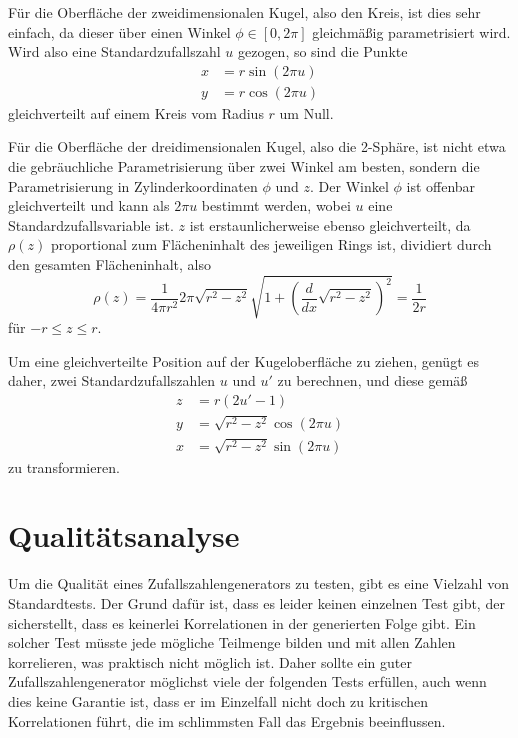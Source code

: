 Für die Oberfläche der zweidimensionalen Kugel, also den Kreis, ist
dies sehr einfach, da dieser über einen Winkel $\phi\in [0,2\pi]$
gleichmäßig parametrisiert wird. Wird also eine Standardzufallszahl
$u$ gezogen, so sind die Punkte
\begin{equation}
  \begin{split}
    x &= r\sin(2\pi u)\\
    y &= r\cos(2\pi u)
  \end{split}
\end{equation}
gleichverteilt auf einem Kreis vom Radius $r$ um Null.

Für die Oberfläche der dreidimensionalen Kugel, also die 2-Sphäre, ist
nicht etwa die gebräuchliche Parametrisierung über zwei Winkel am
besten, sondern die Parametrisierung in Zylinderkoordinaten $\phi$ und
$z$.  Der Winkel $\phi$ ist offenbar gleichverteilt und kann als $2\pi
u$ bestimmt werden, wobei $u$ eine Standardzufallsvariable ist.  $z$
ist erstaunlicherweise ebenso gleichverteilt, da $\rho(z)$
proportional zum Flächeninhalt des jeweiligen Rings ist, dividiert
durch den gesamten Flächeninhalt, also
\begin{equation}
  \rho(z) = \frac{1}{4\pi r^2} 2\pi \sqrt{r^2 - z^2} \sqrt{1 +
    \left(\frac{d}{dx}\sqrt{r^2 - z^2}\right)^2} = \frac{1}{2r}
\end{equation}
für $-r\le z\le r$.

Um eine gleichverteilte Position auf der Kugeloberfläche zu ziehen,
genügt es daher, zwei Standardzufallszahlen $u$ und $u'$ zu
berechnen, und diese gemäß
\begin{equation}
  \label{eq:2sphere}
  \begin{split}
    z &= r(2u' - 1)\\
    y &= \sqrt{r^2-z^2}\cos(2\pi u)\\
    x &= \sqrt{r^2-z^2}\sin(2\pi u)
  \end{split}
\end{equation}
zu transformieren.

\section{Qualitätsanalyse}

Um die Qualität eines Zufallszahlengenerators zu testen, gibt es eine
Vielzahl von Standardtests. Der Grund dafür ist, dass es leider keinen
einzelnen Test gibt, der sicherstellt, dass es keinerlei Korrelationen
in der generierten Folge gibt. Ein solcher Test müsste jede mögliche
Teilmenge bilden und mit allen Zahlen korrelieren, was praktisch nicht
möglich ist. Daher sollte ein guter Zufallszahlengenerator möglichst
viele der folgenden Tests erfüllen, auch wenn dies keine Garantie ist,
dass er im Einzelfall nicht doch zu kritischen Korrelationen führt,
die im schlimmsten Fall das Ergebnis beeinflussen.

